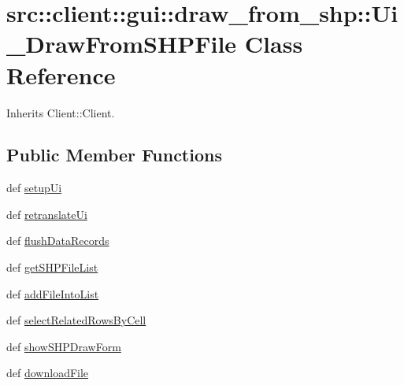 \hypertarget{classsrc_1_1client_1_1gui_1_1draw__from__shp_1_1Ui__DrawFromSHPFile}{
\section{src::client::gui::draw\_\-from\_\-shp::Ui\_\-DrawFromSHPFile Class Reference}
\label{classsrc_1_1client_1_1gui_1_1draw__from__shp_1_1Ui__DrawFromSHPFile}
}


Inherits Client::Client.

\subsection*{Public Member Functions}
\begin{DoxyCompactItemize}
\item 
def \hyperlink{classsrc_1_1client_1_1gui_1_1draw__from__shp_1_1Ui__DrawFromSHPFile_af94bc32e90cbcfa8469784ac724b9038}{setupUi}
\item 
def \hyperlink{classsrc_1_1client_1_1gui_1_1draw__from__shp_1_1Ui__DrawFromSHPFile_a20d3304d04c95c8740827a691441df7b}{retranslateUi}
\item 
def \hyperlink{classsrc_1_1client_1_1gui_1_1draw__from__shp_1_1Ui__DrawFromSHPFile_a6fca0287d0c04cf97c3b1f58b4cb29a4}{flushDataRecords}
\item 
def \hyperlink{classsrc_1_1client_1_1gui_1_1draw__from__shp_1_1Ui__DrawFromSHPFile_ae5a423b3c42a4c0470ff89a33d4691ab}{getSHPFileList}
\item 
def \hyperlink{classsrc_1_1client_1_1gui_1_1draw__from__shp_1_1Ui__DrawFromSHPFile_a71c4f68638b94741c20553b65fbe825e}{addFileIntoList}
\item 
def \hyperlink{classsrc_1_1client_1_1gui_1_1draw__from__shp_1_1Ui__DrawFromSHPFile_aa7aad22defadf11fec1d0eaa7f372a5c}{selectRelatedRowsByCell}
\item 
def \hyperlink{classsrc_1_1client_1_1gui_1_1draw__from__shp_1_1Ui__DrawFromSHPFile_a463c120a1ab89fe4ce04d8f79077b1f5}{showSHPDrawForm}
\item 
def \hyperlink{classsrc_1_1client_1_1gui_1_1draw__from__shp_1_1Ui__DrawFromSHPFile_a39d2ea2385e3f9f6e2a9bcc587c862b5}{downloadFile}
\end{DoxyCompactItemize}
